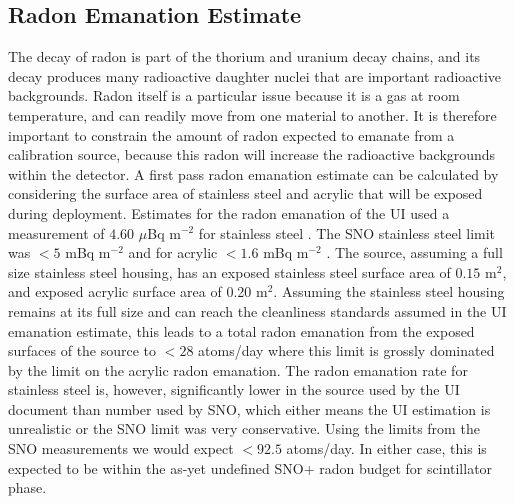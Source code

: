 \subsection{Radon Emanation Estimate}
\label{sec:emanation}
The decay of radon is part of the thorium and uranium decay chains, and its decay produces many radioactive daughter nuclei that are important radioactive backgrounds.
Radon itself is a particular issue because it is a gas at room temperature, and can readily move from one material to another.
It is therefore important to constrain the amount of radon expected to emanate from a calibration source, because this radon will increase the radioactive backgrounds within the detector.
A first pass radon emanation estimate can be calculated by considering the surface area of stainless steel and acrylic that will be exposed during deployment. 
Estimates for the radon emanation of the UI used a measurement of $4.60$ $\mu$Bq m$^{-2}$ for stainless steel \cite{kormos:2015}. 
The SNO stainless steel limit was $< 5$ mBq m$^{-2}$ and for acrylic $< 1.6$ mBq m$^{-2}$ \cite{Liu:1993}. 
The source, assuming a full size stainless steel housing, has an exposed stainless steel surface area of $0.15$ m$^2$, and exposed acrylic surface area of 0.20 m$^2$. 
Assuming the stainless steel housing remains at its full size and can reach the cleanliness standards assumed in the UI emanation estimate, this leads to a total radon emanation from the exposed surfaces of the source to $<28$ atoms/day where this limit is grossly dominated by the limit on the acrylic radon emanation. 
The radon emanation rate for stainless steel is, however, significantly lower in the source used by the UI document than number used by SNO, which either means the UI estimation is unrealistic or the SNO limit was very conservative. 
Using the limits from the SNO measurements we would expect $<92.5$ atoms/day.
In either case, this is expected to be within the as-yet undefined SNO+ radon budget for scintillator phase.

